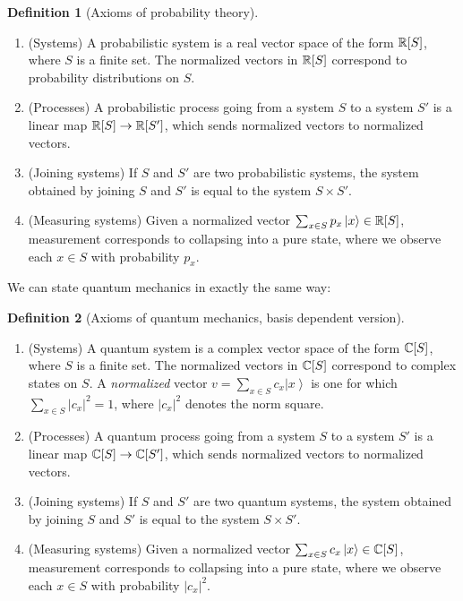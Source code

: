 \documentclass{article}
\theoremstyle{definition}
\newtheorem*{definition}{Definition}
\numberwithin{figure}{section}
\begin{document}
\begin{definition}[Axioms of probability theory] $\,$

\begin{enumerate}
\item (Systems) A probabilistic system is a real vector space of the form $\mathbb{R}[S]$, where $S$ is a finite set. The normalized vectors in $\mathbb{R}[S]$ correspond to probability distributions on $S$.
\item (Processes) A probabilistic process going from a system $S$ to a system $S'$ is a linear map $\mathbb{R}[S]\to \mathbb{R}[S']$, which sends normalized vectors to normalized vectors.
\item (Joining systems) If $S$ and $S'$ are two probabilistic systems, the system obtained by joining $S$ and $S'$ is equal to the system $S\times S'$.
\item (Measuring systems) Given a normalized vector $\sum_{x\in S}p_x \left |x\right>\in \mathbb{R}[S]$, measurement corresponds to collapsing into a pure state, where we observe each $x\in S$ with probability $p_x$.
\end{enumerate}

\raggedleft\qedsymbol{}
\end{definition}

We can state quantum mechanics in exactly the same way:

\begin{definition}[Axioms of quantum mechanics, basis dependent version] $\,$

\begin{enumerate}
\item (Systems) A quantum system is a complex vector space of the form $\mathbb{C}[S]$, where $S$ is a finite set. The normalized vectors in $\mathbb{C}[S]$ correspond to complex states on $S$. A \textit{normalized} vector $v=\sum_{x\in S}c_x\left|x\right>$ is one for which $\sum_{x\in S}|c_x|^2=1$, where $|c_x|^2$ denotes the norm square.
\item (Processes) A quantum process going from a system $S$ to a system $S'$ is a linear map $\mathbb{C}[S]\to \mathbb{C}[S']$, which sends normalized vectors to normalized vectors.
\item (Joining systems) If $S$ and $S'$ are two quantum systems, the system obtained by joining $S$ and $S'$ is equal to the system $S\times S'$.
\item (Measuring systems) Given a normalized vector $\sum_{x\in S}c_x \left |x\right>\in \mathbb{C}[S]$, measurement corresponds to collapsing into a pure state, where we observe each $x\in S$ with probability $|c_x|^2$.
\end{enumerate}

\raggedleft\qedsymbol{}
\end{definition}
\end{document}
